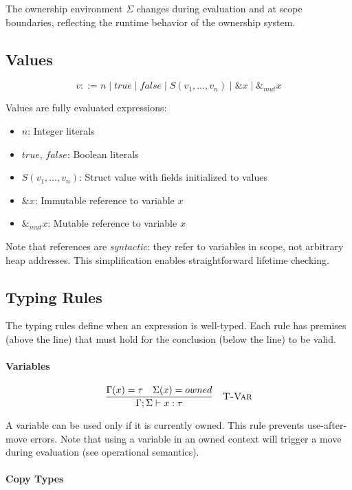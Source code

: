 \documentclass[11pt,a4paper,twoside]{book}
\begin{document}
The ownership environment $\Sigma$ changes during evaluation and at scope
boundaries, reflecting the runtime behavior of the ownership system.


\subsection{Values}

\[
v ::= n \mid true \mid false \mid S(v_1,\dots,v_n) \mid \&x \mid \&_{mut}x
\]

Values are fully evaluated expressions:
\begin{itemize}
  \item $n$: Integer literals
  \item $true$, $false$: Boolean literals
  \item $S(v_1,\dots,v_n)$: Struct value with fields initialized to values
  \item $\&x$: Immutable reference to variable $x$
  \item $\&_{mut}x$: Mutable reference to variable $x$
\end{itemize}

Note that references are \emph{syntactic}: they refer to variables in scope,
not arbitrary heap addresses. This simplification enables straightforward
lifetime checking.


\subsection{Typing Rules}

The typing rules define when an expression is well-typed. Each rule has premises
(above the line) that must hold for the conclusion (below the line) to be valid.

\paragraph{Variables}

\[
\frac{
  \Gamma(x) = \tau \quad \Sigma(x) = owned
}{
  \Gamma ; \Sigma \vdash x : \tau
}
\quad \textsc{T-Var}
\]

A variable can be used only if it is currently owned. This rule prevents
use-after-move errors. Note that using a variable in an owned context will
trigger a move during evaluation (see operational semantics).

\paragraph{Copy Types}
\end{document}
